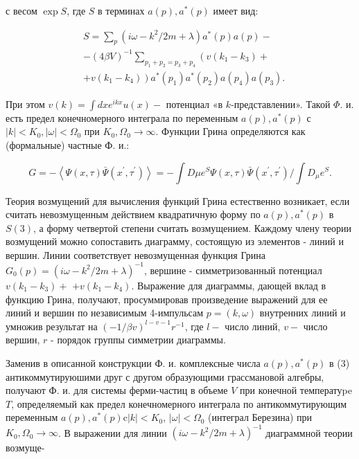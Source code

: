\documentclass[10pt]{article}
\begin{document}
с весом $\exp S$, где $S$ в терминах $a(p), a^{*}(p)$ имеет вид:



\[

\begin{aligned}

& S=\sum_{p}\left(i \omega-k^{2} / 2 m+\lambda\right) a^{*}(p) a(p)- \\

& -(4 \beta V)^{-1} \sum_{p_{1}+p_{2}=p_{3}+p_{4}}\left(v\left(k_{1}-k_{3}\right)+\right. \\

& \left.+v\left(k_{1}-k_{4}\right)\right) a^{*}\left(p_{1}\right) a^{*}\left(p_{2}\right) a\left(p_{4}\right) a\left(p_{3}\right) .

\end{aligned}

\]



При этом $v(k)=\int d x e^{i k x} u(x)-$ потенциал «в $k$-представлении». Такой $\Phi$. и. есть предел конечномерного интеграла по переменным $a(p), a^{*}(p)$ с $|k|<K_{0},|\omega|<\Omega_{0}$ при $K_{0}, \Omega_{0} \rightarrow \infty$. Функции Грина определяются как (формальные) частные Ф. и.:



\[

G=-\left\langle\Psi(x, \tau) \bar{\Psi}\left(x^{\prime}, \tau^{\prime}\right)\right\rangle=-\int D \mu e^{S} \Psi(x, \tau) \bar{\Psi}\left(x^{\prime}, \tau^{\prime}\right) / \int D_{\mu} e^{S} .

\]



Теория возмущений для вычисления функций Грина естественно возникает, если считать невозмущенным действием квадратичную форму по $a(p), a^{*}(p)$ в $S(3)$, а форму четвертой степени считать возмущением. Каждому члену теории возмущений можно сопоставить диаграмму, состоящую из элементов - линий и вершин. Линии соответствует невозмущенная функция Грина $G_{0}(p)=\left(i \omega-k^{2} / 2 m+\lambda\right)^{-1}$, вершине - симметризованный потенциал $v\left(k_{1}-k_{3}\right)+$ $+v\left(k_{1}-k_{4}\right)$. Выражение для диаграммы, дающей вклад в функцию Грина, получают, просуммировав произведение выражений для ее линий и вершин по независимым 4-импульсам $p=(k, \omega)$ внутренних линий и умножив результат на $(-1 / \beta v)^{l-v-1} r^{-1}$, где $l-$ число линий, $v-$ число вершин, $r$ - порядок группы симметрии диаграммы.



Заменив в описанной конструкции Ф. и. комплексные числа $a(p), a^{*}(p)$ в (3) антикоммутируюшими друг с другом образующими грассмановой алгебры, получают Ф. и. для системы ферми-частиц в объеме $V$ при конечной температуpe $T$, определяемый как предел конечномерного интеграла по антикоммутирующим переменным $a(p), a^{*}(p) \mathrm{c}|k|<K_{0}$, $|\omega|<\Omega_{0}$ (интеграл Березина) при $K_{0}, \Omega_{0} \rightarrow \infty$. В выражении для линии $\left(i \omega-k^{2} / 2 m+\lambda\right)^{-1}$ диаграммной теории возмуще-
\end{document}
